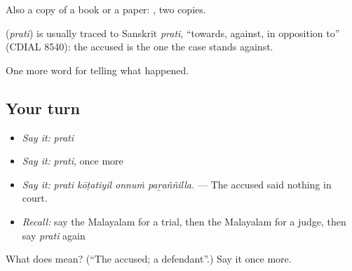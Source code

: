 Also a copy of a book or a paper:  , two copies.

\begin{cousinweb}
\textbf{} (\emph{prati}) is usually traced to Sanskrit \emph{prati}, \textquotedblleft{}towards, against, in opposition to\textquotedblright{} (CDIAL 8540): the accused is the one the case stands against.
\end{cousinweb}

\begin{grammarlens}[title={What you've built}]
One more word for telling what happened.
\end{grammarlens}

\subsection*{Your turn}
\begin{itemize}
\raggedright
  \item \emph{Say it:} \emph{prati}
  \item \emph{Say it:} \emph{prati}, once more
  \item \emph{Say it:} \emph{prati kōṭatiyil onnuṁ paṟaññilla.} — The accused said nothing in court.
  \item \emph{Recall:} say the Malayalam for a trial, then the Malayalam for a judge, then say \emph{prati} again
\end{itemize}

\begin{tcolorbox}[breakable,colback=teal!4,colframe=teal!35!black,title={Before you move on}]
What does  mean? (\textquotedblleft{}The accused; a defendant\textquotedblright{}.) Say it once more.
\end{tcolorbox}
